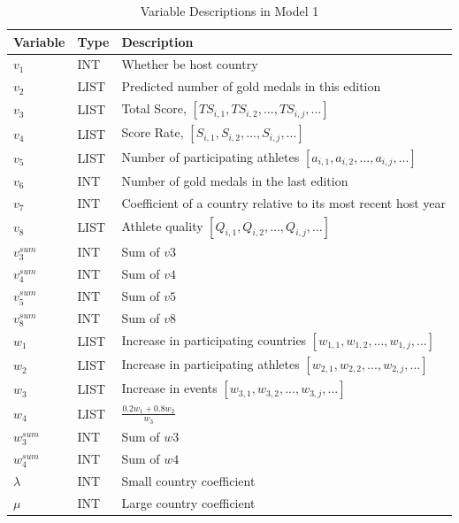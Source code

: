 \documentclass[12pt]{article}
\begin{document}
\begin{table}[h]
\caption{Variable Descriptions in Model 1}
\centering
\begin{tabular}{@{}lll@{}}
\toprule
\textbf{Variable} & \textbf{Type} & \textbf{Description} \\ \midrule
$v_1$ & INT & Whether be host country \\
$v_2$ & LIST & Predicted number of gold medals in this edition \\
$v_3$ & LIST & Total Score, $ [TS_{i,1}, TS_{i,2},...,TS_{i,j},... ] $ \\
$v_4$ & LIST & Score Rate, $ [S_{i,1}, S_{i,2},...,S_{i,j},... ] $ \\
$v_5$ & LIST & Number of participating athletes $ [a_{i,1}, a_{i,2},...,a_{i,j},... ] $ \\
$v_6$ & INT & Number of gold medals in the last edition \\
$v_7$ & INT & Coefficient of a country relative to its most recent host year \\
$v_8$ & LIST & Athlete quality $ [Q_{i,1}, Q_{i,2},...,Q_{i,j},... ] $ \\
$v_3^{sum}$ & INT & Sum of $v3$ \\
$v_4^{sum}$ & INT & Sum of $v4$ \\
$v_5^{sum}$ & INT & Sum of $v5$ \\
$v_8^{sum}$ & INT & Sum of $v8$ \\ \midrule
$w_1$ & LIST & Increase in participating countries $ [w_{1,1}, w_{1,2},...,w_{1,j},... ] $\\
$w_2$ & LIST & Increase in participating athletes $ [w_{2,1}, w_{2,2},...,w_{2,j},... ] $ \\
$w_3$ & LIST & Increase in events $ [w_{3,1}, w_{3,2},...,w_{3,j},... ] $ \\
$w_4$ & LIST & $\frac{0.2w_1+0.8w_2}{w_3}$ \\
$w_3^{sum}$ & INT & Sum of $w3$ \\
$w_4^{sum}$ & INT & Sum of $w4$ \\\midrule
$\lambda$ & INT & Small country coefficient \\
$\mu$ & INT & Large country coefficient \\\bottomrule
\end{tabular}
\label{tab:variable_descriptions}
\end{table}
\end{document}

